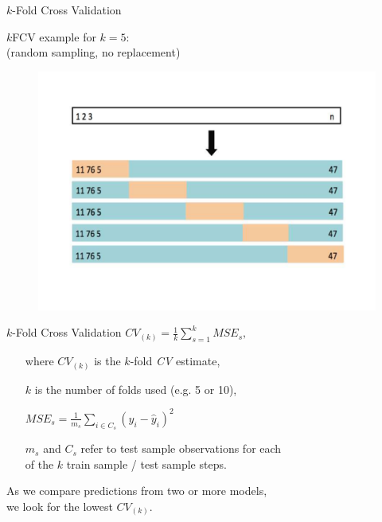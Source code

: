 \documentclass{beamer}
\begin{document}
\begin{frame}{$k$-Fold Cross Validation}
\begin{center}
$k$FCV example for $k=5$: \\
(random sampling, no replacement)
\begin{figure}
\includegraphics[width=0.7\linewidth]{img/kFCV2.pdf}
\end{figure}
\end{center}
\end{frame}
\begin{frame}{$k$-Fold Cross Validation}
$ \textit{CV}_{(k)}= \frac{1}{k}\displaystyle\sum_{s=1}^{k} \textit{MSE}_s ,$
\vspace{0.3cm}
\begin{itemize}
\item [where] $\textit{CV}_{(k)}$ is the $k$-fold \textit{CV} estimate,
\item [ ] $k$ is the number of folds used (e.g. 5 or 10),
\item [ ] $\textit{MSE}_s = \frac{1}{m_s} \sum_{i \in C_s}^{}(y_i - \widehat{y}_i)^2 $ 
\item [ ] $m_s$ and $C_s$ refer to test sample  observations for each \\of the $k$ train sample / test sample steps.
\end{itemize}
\vspace{0.3cm}
As we compare predictions from two or more models, 
\\we look for the lowest $\textit{CV}_{(k)}$. 
\end{frame}
\end{document}
